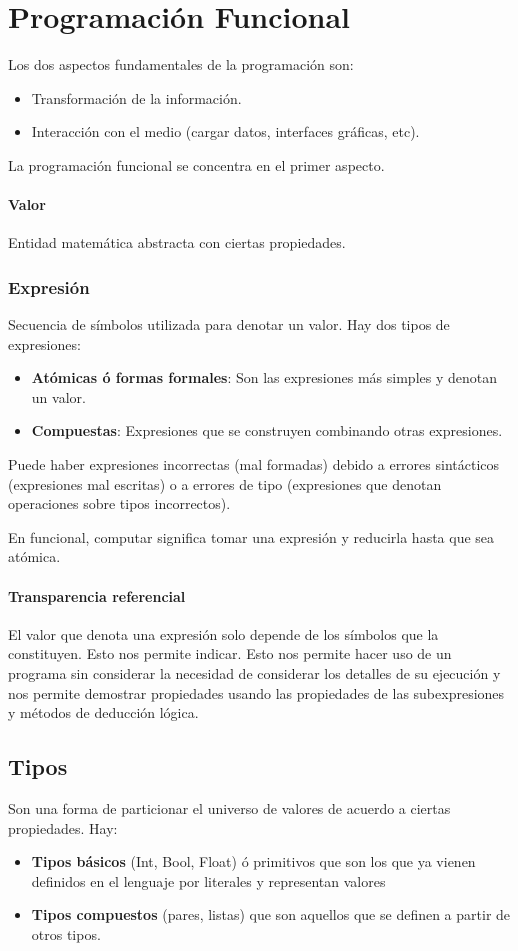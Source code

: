 \section{Programación Funcional}
Los dos aspectos fundamentales de la programación son:
\begin{itemize}
	\item Transformación de la información.
	\item Interacción con el medio (cargar datos, interfaces gráficas, etc).
\end{itemize}
La programación funcional se concentra en el primer aspecto.

\paragraph{Valor} Entidad matemática abstracta con ciertas propiedades.

\subsubsection{Expresión} 

Secuencia de símbolos utilizada para denotar un valor. Hay dos tipos de expresiones:
\begin{itemize}
	\item \textbf{Atómicas ó formas formales}: Son las expresiones más simples y denotan un valor.
	\item \textbf{Compuestas}: Expresiones que se construyen combinando otras expresiones.
\end{itemize}

Puede haber expresiones incorrectas (mal formadas) debido a errores sintácticos (expresiones mal escritas) o a errores de tipo (expresiones que denotan operaciones sobre tipos incorrectos).

En funcional, computar significa tomar una expresión y reducirla hasta que sea atómica.

\paragraph{Transparencia referencial} El valor que denota una expresión solo depende de los símbolos que la constituyen. Esto nos permite indicar. Esto nos permite hacer uso de un programa sin considerar la necesidad de considerar los detalles de su ejecución y nos permite demostrar propiedades usando las propiedades de las subexpresiones y métodos  de deducción lógica.

\subsection{Tipos}
Son una forma de particionar el universo de valores de acuerdo a ciertas propiedades. Hay:
\begin{itemize}
	\item \textbf{Tipos básicos} (Int, Bool, Float) ó primitivos que son los que ya vienen definidos en el lenguaje por literales y representan valores 
	\item \textbf{Tipos compuestos} (pares, listas) que son aquellos que se definen a partir de otros tipos.
\end{itemize}

